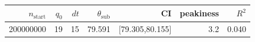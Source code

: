 \begin{tabular}{r r r r r r r}
\hline
$n_{\mathrm{start}}$ & $q_0$ & $dt$ & $\theta_{\mathrm{sub}}$ & CI & peakiness & $R^2$ \\
\hline
200000000 & 19 & 15 & 79.591 & [79.305,80.155] & 3.2 & 0.040 \\
\hline
\end{tabular}
